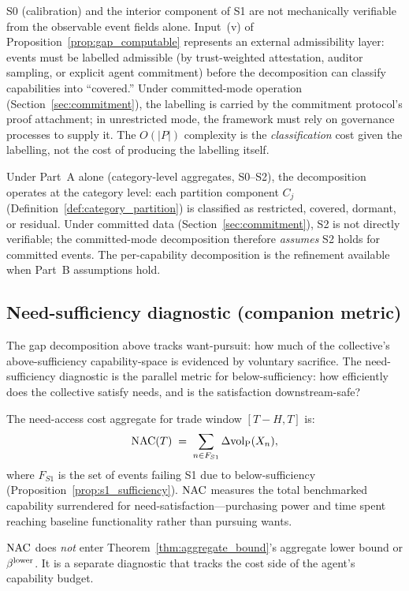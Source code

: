 \begin{remark}
\label{rem:admissibility_external}
S0 (calibration) and the interior component of S1 are not
mechanically verifiable from the observable event fields alone.
Input~(v) of Proposition~\ref{prop:gap_computable} represents an
external admissibility layer: events must be labelled admissible
(by trust-weighted attestation, auditor sampling, or explicit
agent commitment) before the decomposition can classify
capabilities into ``covered.''  Under committed-mode operation
(Section~\ref{sec:commitment}), the labelling is carried by the
commitment protocol's proof attachment; in unrestricted mode, the
framework must rely on governance processes to supply it.  The
$O(|P|)$ complexity is the \emph{classification} cost given the
labelling, not the cost of producing the labelling itself.
\end{remark}

\begin{remark}
Under Part~A alone (category-level aggregates, S0--S2), the
decomposition operates at the category level: each partition
component $C_j$
(Definition~\ref{def:category_partition}) is classified as
restricted, covered, dormant, or residual.  Under committed data
(Section~\ref{sec:commitment}), S2 is not directly verifiable;
the committed-mode decomposition therefore \emph{assumes} S2
holds for committed events.  The per-capability decomposition is
the refinement available when Part~B assumptions hold.
\end{remark}

\subsection{Need-sufficiency diagnostic (companion metric)}
\label{sec:need_diagnostic}

The gap decomposition above tracks want-pursuit: how much of the
collective's above-sufficiency capability-space is evidenced by
voluntary sacrifice.  The need-sufficiency diagnostic is the
parallel metric for below-sufficiency: how efficiently does the
collective satisfy needs, and is the satisfaction downstream-safe?

\begin{definition}
\label{def:nac}
The need-access cost aggregate for trade window $[T - H, T]$ is:
\[
  \mathrm{NAC}(T) \;=\; \sum_{n \in F_{S1}}
  \Delta{\operatorname{vol}_{\mathrm{P}}}(X_n),
\]
where $F_{S1}$ is the set of events failing S1 due to
below-sufficiency (Proposition~\ref{prop:s1_sufficiency}).
$\mathrm{NAC}$ measures the total benchmarked capability surrendered for
need-satisfaction---purchasing power and time spent reaching
baseline functionality rather than pursuing wants.

$\mathrm{NAC}$ does \emph{not} enter
Theorem~\ref{thm:aggregate_bound}'s aggregate lower bound or
$\beta^{\mathrm{lower}}$.  It is a separate diagnostic that tracks the cost side
of the agent's capability budget.
\end{definition}

